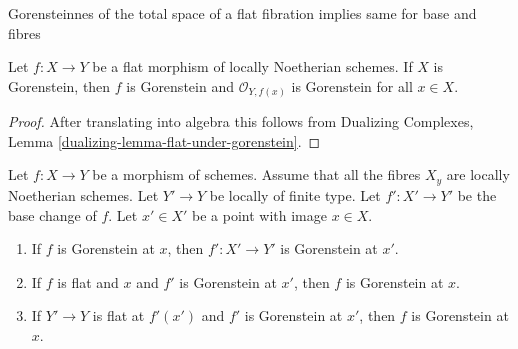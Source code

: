 \begin{lemma}
\label{lemma-flat-morphism-from-gorenstein-scheme}
\begin{slogan}
Gorensteinnes of the total space of a flat fibration implies
same for base and fibres
\end{slogan}
Let $f : X \to Y$ be a flat morphism of locally Noetherian schemes.
If $X$ is Gorenstein, then $f$ is Gorenstein and $\mathcal{O}_{Y, f(x)}$
is Gorenstein for all $x \in X$.
\end{lemma}

\begin{proof}
After translating into algebra this follows from
Dualizing Complexes, Lemma \ref{dualizing-lemma-flat-under-gorenstein}.
\end{proof}

\begin{lemma}
\label{lemma-base-change-gorenstein}
Let $f : X \to Y$ be a morphism of schemes.
Assume that all the fibres $X_y$ are locally Noetherian schemes.
Let $Y' \to Y$ be locally of finite type. Let $f' : X' \to Y'$
be the base change of $f$.
Let $x' \in X'$ be a point with image $x \in X$.
\begin{enumerate}
\item If $f$ is Gorenstein at $x$, then
$f' : X' \to Y'$ is Gorenstein at $x'$.
\item If $f$ is flat and $x$ and $f'$ is Gorenstein at $x'$, then $f$
is Gorenstein at $x$.
\item If $Y' \to Y$ is flat at $f'(x')$ and $f'$ is Gorenstein at
$x'$, then $f$ is Gorenstein at $x$.
\end{enumerate}
\end{lemma}

